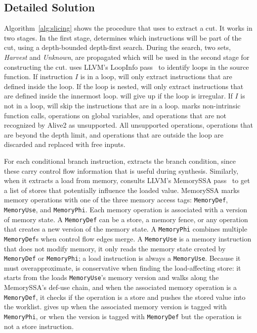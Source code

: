 \subsection{Detailed Solution}

Algorithm~\ref{alg:slicing} shows the procedure that \minotaur{} uses to
extract a cut.
%
It works in two stages.
%
In the first stage, \minotaur{} determines which instructions will be part
of the cut, using a depth-bounded depth-first search.
%
During the search, two sets, \emph{Harvest} and \emph{Unknown}, are
propagated which will be used in the second stage for constructing the
cut.
%
\minotaur{} uses LLVM's LoopInfo pass~\cite{loopinfo} to identify loops in the
source function.
%
If instruction $I$ is in a loop, \minotaur{} will only extract
instructions that are defined inside the loop.
If the loop is nested, \minotaur{} will only extract instructions that are
defined inside the innermost loop.
\minotaur{} will give up if the loop is irregular.
%
If $I$ is not in a loop, \minotaur{} will skip the instructions that are in a loop.
%
\minotaur{} marks non-intrinsic function calls, operations on global
variables, and operations that are not recognized by Alive2 as
unsupported.
%
All unsupported operations, operations that are beyond the depth
limit, and operations that are outside the loop are discarded and
replaced with free inputs.


For each conditional branch instruction, \minotaur{} extracts the branch
condition, since these carry control flow information that is useful
during synthesis.
%
Similarly, when it extracts a load from memory, \minotaur{} consults
LLVM's MemorySSA pass~\cite{MemorySSA} to get a list of stores that
potentially influence the loaded value.
%
MemorySSA marks memory operations with one of the three memory access tags:
\texttt{MemoryDef}, \texttt{MemoryUse}, and \texttt{MemoryPhi}.
Each memory operation is associated with a version of memory state.
%
A \texttt{MemoryDef} can be a store, a memory fence, or any operation
that creates a new version of the memory state.
%
A \texttt{MemoryPhi} combines multiple \texttt{MemoryDef}s when
control flow edges merge.
%
A \texttt{MemoryUse} is a memory instruction that does not modify
memory, it only reads the memory state created by \texttt{MemoryDef}
or \texttt{MemoryPhi}; a load instruction is always a
\texttt{MemoryUse}.
%
Because it must overapproximate, \minotaur{} is conservative when finding
the load-affecting store: it starts from the loads
\texttt{MemoryUse}'s memory version and walks along the MemorySSA's
def-use chain,
%
and when the associated memory operation is a \texttt{MemoryDef}, it
checks if the operation is a store and pushes the stored value into
the worklist.
%
\minotaur{} gives up when the associated memory version is tagged with
\texttt{MemoryPhi}, or when the version is tagged with
\texttt{MemoryDef} but the operation is not a store instruction.


